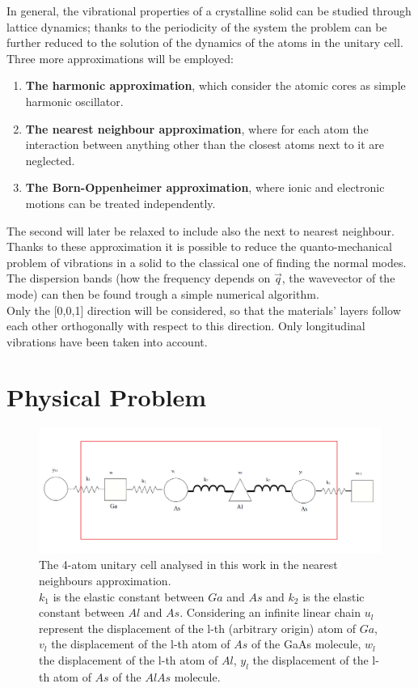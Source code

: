 \documentclass{article}
\begin{document}
In general, the vibrational properties of a crystalline solid can be studied through lattice dynamics; thanks to the periodicity of the system the problem can be further reduced to the solution of the dynamics of the atoms in the unitary cell.\\
	Three more approximations will be employed:
	\begin{enumerate}
		\item \textbf{The harmonic approximation}, which consider the atomic cores as simple harmonic oscillator.
		\item \textbf{The nearest neighbour approximation}, where for each atom the interaction between anything other than the closest atoms next to it are neglected.
		\item \textbf{The Born-Oppenheimer approximation}, where ionic and electronic motions can be treated independently.
	\end{enumerate}
	The second will later be relaxed to include also the next to nearest neighbour.\\
	Thanks to these approximation it is possible to reduce the quanto-mechanical problem of vibrations in a solid to the classical one of finding the normal modes. The dispersion bands (how the frequency depends on $\vec{q}$, the wavevector of the mode) can then be found trough a simple numerical algorithm.\\
Only the [0,0,1] direction will be considered, so that the materials' layers follow each other orthogonally with respect to this direction. Only longitudinal vibrations have been taken into account. \\

	\section{Physical Problem}

\begin{figure}
	\centering
	\includegraphics[width=0.7\linewidth]{cella.png}
	\caption{The 4-atom unitary cell analysed in this work in the nearest neighbours approximation.\\
	$k_1$ is the elastic constant between $Ga$ and $As$ and $k_2$ is the elastic constant between $Al$ and $As$. Considering an infinite linear chain $u_l$ represent the displacement of the l-th (arbitrary origin) atom of $Ga$, $v_l$ the displacement of the l-th atom of $As$ of the GaAs molecule, $w_l$ the displacement of the l-th atom of $Al$, $y_l$ the displacement of the l-th atom of $As$ of the $AlAs$ molecule.   }
	\label{fig:cella}
\end{figure}
\end{document}
